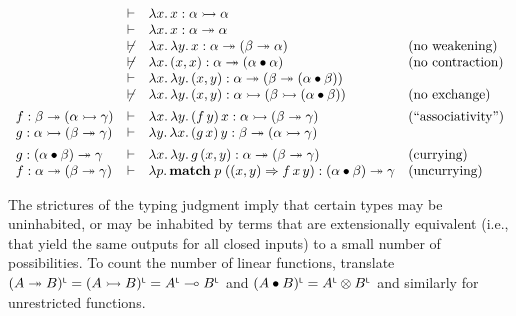 \documentclass[10pt,a4paper]{amsart}
\begin{document}
\par  \quad  \[\begin{array}[]{lcll}&\vdash&\lambda x.\,x:\alpha\rightarrowtail\alpha\\
&\vdash&\lambda x.\,x:\alpha\twoheadrightarrow\alpha\\
&\not\vdash&\lambda x.\,\lambda y.\,x:\alpha\twoheadrightarrow(\beta\twoheadrightarrow\alpha)&(\mbox{no weakening})\\
&\not\vdash&\lambda x.\,(x,x):\alpha\twoheadrightarrow(\alpha\bullet\alpha)&(\mbox{no contraction})\\
&\vdash&\lambda x.\,\lambda y.\,(x,y):\alpha\twoheadrightarrow(\beta\twoheadrightarrow(\alpha\bullet\beta))\\
&\not\vdash&\lambda x.\,\lambda y.\,(x,y):\alpha\rightarrowtail(\beta\rightarrowtail(\alpha\bullet\beta))&(\mbox{no exchange})\\[4.30554pt]
f:\beta\twoheadrightarrow(\alpha\rightarrowtail\gamma)&\vdash&\lambda x.\,\lambda y.\,(f\,y)\,x:\alpha\rightarrowtail(\beta\twoheadrightarrow\gamma)&(\mbox{``associativity''})\\
g:\alpha\rightarrowtail(\beta\twoheadrightarrow\gamma)&\vdash&\lambda y.\,\lambda x.\,(g\,x)\,y:\beta\twoheadrightarrow(\alpha\rightarrowtail\gamma)\\[4.30554pt]
g:(\alpha\bullet\beta)\twoheadrightarrow\gamma&\vdash&\lambda x.\,\lambda y.\,g\,(x,y):\alpha\twoheadrightarrow(\beta\twoheadrightarrow\gamma)&(\mbox{currying})\\
f:\alpha\twoheadrightarrow(\beta\twoheadrightarrow\gamma)&\vdash&\lambda p.\,\mathbf{match}\;p\;((x,y)\Rightarrow f\,x\,y):(\alpha\bullet\beta)\twoheadrightarrow\gamma&(\mbox{uncurrying})\end{array}\]\quad  \quad  
  
 
 
The strictures of the typing judgment imply that certain types may be uninhabited, or may be inhabited by terms that are extensionally equivalent (i.e., that yield the same outputs for all closed inputs) to a small number of possibilities. To count the number of linear functions, translate $(A\twoheadrightarrow B)^{\mathchoice{\mathsf{L}}{\mathsf{L}}{\scriptscriptstyle\mathsf{L}}{\scriptscriptstyle\mathsf{L}}}=(A\rightarrowtail
B)^{\mathchoice{\mathsf{L}}{\mathsf{L}}{\scriptscriptstyle\mathsf{L}}{\scriptscriptstyle\mathsf{L}}}=A^{\mathchoice{\mathsf{L}}{\mathsf{L}}{\scriptscriptstyle\mathsf{L}}{\scriptscriptstyle\mathsf{L}}}\multimap B^{\mathchoice{\mathsf{L}}{\mathsf{L}}{\scriptscriptstyle\mathsf{L}}{\scriptscriptstyle\mathsf{L}}}$ and $(A\bullet B)^{\mathchoice{\mathsf{L}}{\mathsf{L}}{\scriptscriptstyle\mathsf{L}}{\scriptscriptstyle\mathsf{L}}}=A^{\mathchoice{\mathsf{L}}{\mathsf{L}}{\scriptscriptstyle\mathsf{L}}{\scriptscriptstyle\mathsf{L}}}\otimes B^{\mathchoice{\mathsf{L}}{\mathsf{L}}{\scriptscriptstyle\mathsf{L}}{\scriptscriptstyle\mathsf{L}}}$ and similarly for unrestricted functions.\par
   
\end{document}
